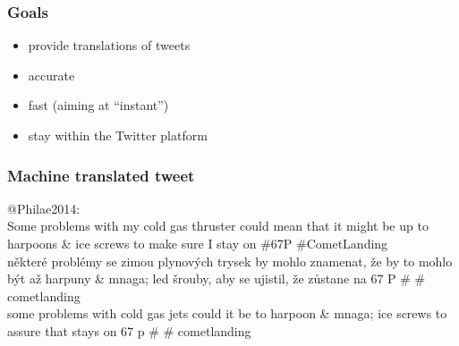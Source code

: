 \documentclass[12pt]{beamer}
\begin{document}
\begin{frame}
	\frametitle{Goals}
	\begin{itemize}
		\item \textcolor{TCTsilver}{provide translations of tweets}
		\item \textcolor{TCTsilver}{accurate}
		\item \textcolor{TCTsilver}{fast (aiming at ``instant'')}
		\item \textcolor{TCTsilver}{stay within the Twitter platform}
	\end{itemize}
\end{frame}

\begin{frame}
	\frametitle{Machine translated tweet}
	\begin{center}
	\textcolor{TCTgray}{\Large @Philae2014:}
	\\[0.5cm]
	\textcolor{TCTblue}{Some problems with my cold gas thruster could mean that it might be up to harpoons \& ice screws to make sure I stay on \#67P  \#CometLanding}
	\\[0.5cm]
	\textcolor{TCTgray}{některé problémy se zimou plynových trysek by mohlo znamenat, že by to mohlo být až harpuny \& mnaga; led šrouby, aby se ujistil, že zůstane na 67 P \# \# cometlanding }
	\\[0.5cm]
	\textcolor{TCTblue}{some problems with cold gas jets could it be to harpoon \& mnaga; ice screws to assure that stays on 67 p \# \# cometlanding }
	\end{center}
\end{frame}
\end{document}
